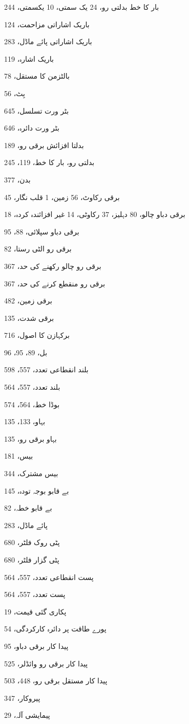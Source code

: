 \begin{theindex}
\item بار کا خط 
     \subitem بدلتی رو، 24 
     \subitem یک سمتی، 10 
     \subitem یکسمتی، 244
\item باریک اشاراتی 
     \subitem مزاحمت، 124
\item باریک اشاراتی پائے ماڈل، 283
\item باریک اشارہ، 119
\item بالٹزمن کا مستقل، 78
\item بِٹ، 56
\item بٹر ورت تسلسل، 645
\item بٹر ورت دائرہ، 646
\item بدلتا افزائش برقی رو، 189
\item بدلتی رو، بار کا خط، 119، 245
\item بدن، 377
\item برقی 
     \subitem رکاوٹ، 56 
     \subitem زمین، 1 
     \subitem قلب نگار، 45
\item برقی دباو 
     \subitem چالو، 80 
     \subitem دہلیز، 37 
     \subitem رکاوٹی، 14 
     \subitem غیر افزائندہ کردہ، 18
\item برقی دباو سپلائی، 88، 95
\item برقی رو 
     \subitem الٹی رستا، 82
\item برقی رو چالو رکھنے کی حد، 367
\item برقی رو منقطع کرنے کی حد، 367
\item برقی زمین، 482
\item برقی شدت، 135
\item برکہازن کا اصول، 716
\item بل، 89، 95، 96
\item بلند انقطاعی تعدد، 557، 598
\item بلند تعدد، 557، 564
\item بوڈا خط، 564، 574
\item بہاو، 133، 135
\item بہاو برقی رو، 135
\item بیس، 181
\item بیس مشترک، 344
\item بے قابو بوجہ تودہ، 145
\item بے قابو خطہ، 82

\indexspace

\item پائے ماڈل، 283
\item پٹی روک فلٹر، 680
\item پٹی گزار فلٹر، 680
\item پست انقطاعی تعدد، 557، 564
\item پست تعدد، 557، 564
\item پکاری گئی قیمت، 19
\item پورے طاقت پر دائرہ کارکردگی، 54
\item پیدا کار برقی دباو، 95
\item پیدا کار برقی رو 
     \subitem وائڈلر، 525
\item پیدا کار مستقل برقی رو، 448، 503
\item پیروکار، 347
\item پیمایشی آلہ، 29


\end{theindex}
